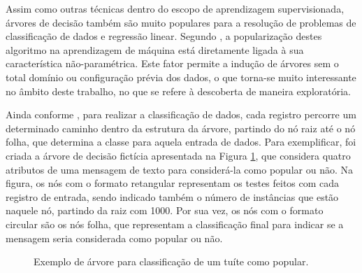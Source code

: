 \documentclass[oneside,openright,12pt]{ufsm_2015} %
\begin{document}
    \par Assim como outras técnicas dentro do escopo de aprendizagem supervisionada, árvores de decisão também são muito populares para a resolução de problemas de classificação de dados e regressão linear. Segundo \cite{book:han:11}, a popularização destes algoritmo na aprendizagem de máquina está diretamente ligada à sua característica não-paramétrica. Este fator permite a indução de árvores sem o total domínio ou configuração prévia dos dados, o que torna-se muito interessante no âmbito deste trabalho, no que se refere à descoberta de maneira exploratória.
    
    \par Ainda conforme \cite{book:han:11}, para realizar a classificação de dados, cada registro percorre um determinado caminho dentro da estrutura da árvore, partindo do nó raiz até o nó folha, que determina a classe para aquela entrada de dados. Para exemplificar, foi criada a árvore de decisão fictícia apresentada na Figura \ref{fig:exemplo_arvore}, que considera quatro atributos de uma mensagem de texto para considerá-la como popular ou não. Na figura, os nós com o formato retangular representam os testes feitos com cada registro de entrada, sendo indicado também o número de instâncias que estão naquele nó, partindo da raiz com 1000. Por sua vez, os nós com o formato circular são os nós folha, que representam a classificação final para indicar se a mensagem seria considerada como popular ou não.
    
    \begin{figure}[ht]
    \caption{Exemplo de árvore para classificação de um tuíte como popular.}
    \centering
    \label{fig:exemplo_arvore}
    \end{figure}
    
\end{document}
